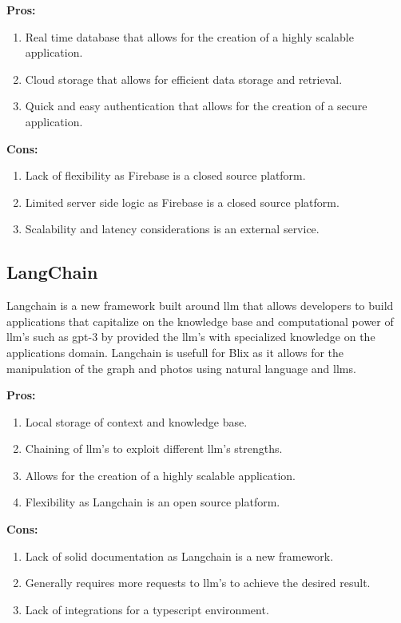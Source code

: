 \documentclass[11pt,a4paper]{article}
\begin{document}
\textbf{Pros:}
\begin{enumerate}[label*=\arabic*.]
	\item[\textbullet] Real time database that allows for the creation of a
	highly scalable application.
	\item[\textbullet] Cloud storage that allows for efficient data storage and
	retrieval.
	\item[\textbullet] Quick and easy authentication that allows for the
	creation of a secure application.
\end{enumerate}

\textbf{Cons:}
\begin{enumerate}[label*=\arabic*.]
	\item[\textbullet] Lack of flexibility as Firebase is a closed source
	platform.
	\item[\textbullet] Limited server side logic as Firebase is a closed source
	platform.
	\item[\textbullet] Scalability and latency considerations is an external
	service.
\end{enumerate}


\subsection{LangChain}

Langchain is a new framework built around llm that allows developers to build
applications that capitalize on the knowledge base and computational power of 
llm's such as gpt-3 by provided the llm's with specialized knowledge on the 
applications domain. Langchain is usefull for Blix as it allows for the manipulation
of the graph and photos using natural language and llms. 

\textbf{Pros:}
\begin{enumerate}[label*=\arabic*.]
	\item[\textbullet] Local storage of context and knowledge base.
	\item[\textbullet] Chaining of llm's to exploit different llm's strengths.
	\item[\textbullet] Allows for the creation of a highly scalable application.
	\item[\textbullet] Flexibility as Langchain is an open source platform.
\end{enumerate}

\textbf{Cons:}
\begin{enumerate}[label*=\arabic*.]
	\item[\textbullet] Lack of solid documentation as Langchain is a new framework.
	\item[\textbullet] Generally requires more requests to llm's to achieve the desired result.
	\item[\textbullet] Lack of integrations for a typescript environment.
\end{enumerate}
\end{document}

